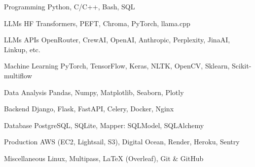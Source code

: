 

\begin{cvskills}

\cvskill
    {Programming} %
    {Python, C/C++, Bash, SQL} %

  \cvskill
    {LLMs} %
    { HF Transformers, PEFT, Chroma, PyTorch, llama.cpp} %
    
 \cvskill
    {LLMs APIs} %
    { OpenRouter, CrewAI, OpenAI, Anthropic, Perplexity, JinaAI, Linkup, etc.} %
    
 \cvskill
    {Machine Learning} %
    { PyTorch, TensorFlow, Keras, NLTK, OpenCV, Sklearn, Scikit-multiflow} %
    
 \cvskill
    {Data Analysis} %
    {Pandas, Numpy, Matplotlib, Seaborn, Plotly} %

 \cvskill
    {Backend} %
    {Django, Flask, FastAPI, Celery, Docker, Nginx} %

 \cvskill
    {Database} %
    {PostgreSQL, SQLite, Mapper: SQLModel, SQLAlchemy} %

 \cvskill
    {Production} %
    {AWS (EC2, Lightsail, S3), Digital Ocean, Render, Heroku, Sentry} %

  \cvskill
    {Miscellaneous} %
    {Linux, Multipass, LaTeX (Overleaf), Git \& GitHub} %

\end{cvskills}
